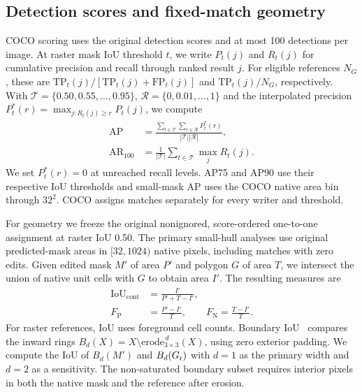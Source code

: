 \subsection{Detection scores and fixed-match geometry}
\label{sec:metrics}
COCO scoring uses the original detection scores and at most 100 detections per image. At raster mask IoU threshold \(t\), we write \(P_t(j)\) and \(R_t(j)\) for cumulative precision and recall through ranked result \(j\). For eligible references \(N_G\), these are \(\mathrm{TP}_t(j)/[\mathrm{TP}_t(j)+\mathrm{FP}_t(j)]\) and \(\mathrm{TP}_t(j)/N_G\), respectively. With \(\mathcal T=\{0.50,0.55,\ldots,0.95\}\), \(\mathcal R=\{0,0.01,\ldots,1\}\) and the interpolated precision \(P_t^*(r)=\max_{j:R_t(j)\geq r}P_t(j)\), we compute
\begin{equation}
\begin{aligned}
 \mathrm{AP}&=\frac{\sum_{t\in\mathcal T}\sum_{r\in\mathcal R}P_t^*(r)}
 {|\mathcal T||\mathcal R|},\\
 \mathrm{AR}_{100}&=\frac{1}{|\mathcal T|}\sum_{t\in\mathcal T}\max_j R_t(j).
\end{aligned}
\label{eq:coco-metrics}
\end{equation}
We set \(P_t^*(r)=0\) at unreached recall levels. AP75 and AP90 use their respective IoU thresholds and small-mask AP uses the COCO native area bin through \(32^2\). COCO assigns matches separately for every writer and threshold.

For geometry we freeze the original nonignored, score-ordered one-to-one assignment at raster IoU 0.50. The primary small-hull analyses use original predicted-mask areas in \([32,1024)\) native pixels, including matches with zero edits. Given edited mask \(M'\) of area \(P'\) and polygon \(G\) of area \(T\), we intersect the union of native unit cells with \(G\) to obtain area \(I'\). The resulting measures are
\begin{equation}
 \begin{aligned}
  \mathrm{IoU}_{\mathrm{cont}} &= \frac{I'}{P'+T-I'},\\
  F_{\mathrm{P}} &= \frac{P'-I'}{T},\qquad F_{\mathrm{N}}=\frac{T-I'}{T}.
 \end{aligned}
 \label{eq:fixed-geometry-metrics}
\end{equation}
For raster references, IoU uses foreground cell counts. Boundary IoU~\cite{boundaryiou} compares the inward rings \(B_d(X)=X\setminus\mathrm{erode}_{3\times3}^{\,d}(X)\), using zero exterior padding. We compute the IoU of \(B_d(M')\) and \(B_d(G_{\rm r})\) with \(d=1\) as the primary width and \(d=2\) as a sensitivity. The non-saturated boundary subset requires interior pixels in both the native mask and the reference after erosion.

